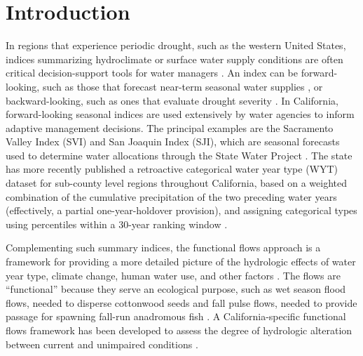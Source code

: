 \documentclass[hess, manuscript]{copernicus}
\begin{document}
\section{Introduction}

In regions that experience periodic drought, such as the western United
States, indices summarizing hydroclimate or surface water supply
conditions are often critical decision-support tools for water managers
\citep[e.g.,][]{Garen1993}. An index can be forward-looking, such as
those that forecast near-term seasonal water supplies
\citep[e.g.,][]{Null2013, Verley2020}, or backward-looking, such as ones
that evaluate drought severity
\citep[e.g.,][]{Palmer1965, Guttman1998a, McKee1993, Wilhite1985, Wilhite2000}.
In California, forward-looking seasonal indices are used extensively by
water agencies to inform adaptive management decisions. The principal
examples are the Sacramento Valley Index (SVI) and San Joaquin Index
(SJI), which are seasonal forecasts used to determine water allocations
through the State Water Project
\citetext{\citealp{Null2013}; \citeyear[DWR][]{DWR2022}}. The state has
more recently published a retroactive categorical water year type (WYT)
dataset for sub-county level regions throughout California, based on a
weighted combination of the cumulative precipitation of the two
preceding water years (effectively, a partial one-year-holdover
provision), and assigning categorical types using percentiles within a
30-year ranking window \citeyearpar[DWR][]{DWR2021a}.

Complementing such summary indices, the functional flows approach is a
framework for providing a more detailed picture of the hydrologic
effects of water year type, climate change, human water use, and other
factors \citep[e.g.,][]{Poff1997, Bunn2002, Poff2010, Wheeler2018}. The
flows are ``functional'' because they serve an ecological purpose, such
as wet season flood flows, needed to disperse cottonwood seeds
\citep{Mahoney1998} and fall pulse flows, needed to provide passage for
spawning fall-run anadromous fish \citep{Moyle2002a}. A
California-specific functional flows framework has been developed to
assess the degree of hydrologic alteration between current and
unimpaired conditions \citep{Yarnell2020, Patterson2020}.
\end{document}
